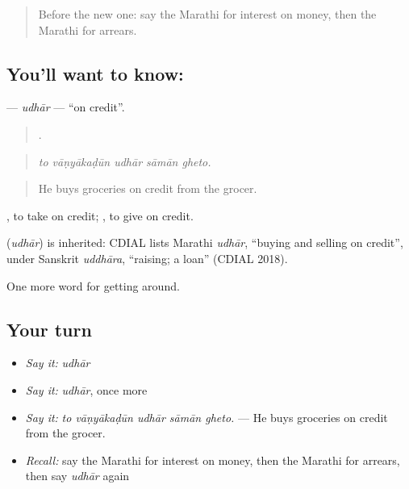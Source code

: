 \label{lesson:MR-C427-udhar}



\begin{quote}
Before the new one: say the Marathi for interest on money, then the Marathi for arrears.
\end{quote}

\subsection*{You'll want to know: }
\textbf{} — \emph{udhār} — \textquotedblleft{}on credit\textquotedblright{}.

\begin{quote}
    .
\end{quote}

\begin{quote}
\emph{to vāṇyākaḍūn udhār sāmān gheto.}
\end{quote}

\begin{quote}
He buys groceries on credit from the grocer.
\end{quote}

 , to take on credit;  , to give on credit.

\begin{cousinweb}
\textbf{} (\emph{udhār}) is inherited: CDIAL lists Marathi \emph{udhār}, \textquotedblleft{}buying and selling on credit\textquotedblright{}, under Sanskrit \emph{uddhāra}, \textquotedblleft{}raising; a loan\textquotedblright{} (CDIAL 2018).
\end{cousinweb}

\begin{grammarlens}[title={What you've built}]
One more word for getting around.
\end{grammarlens}

\subsection*{Your turn}
\begin{itemize}
\raggedright
  \item \emph{Say it:} \emph{udhār}
  \item \emph{Say it:} \emph{udhār}, once more
  \item \emph{Say it:} \emph{to vāṇyākaḍūn udhār sāmān gheto.} — He buys groceries on credit from the grocer.
  \item \emph{Recall:} say the Marathi for interest on money, then the Marathi for arrears, then say \emph{udhār} again
\end{itemize}

